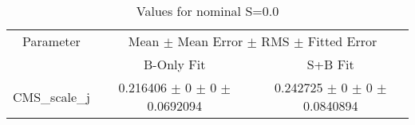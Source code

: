 \begin{table}
\centering
\caption{Values for nominal S=0.0}
\begin{tabular}{ccc}
\toprule
Parameter & \multicolumn{2}{c}{Mean $\pm$ Mean Error $\pm$ RMS $\pm$ Fitted Error}\\
 & B-Only Fit & S+B Fit\\
\midrule
CMS\_scale\_j & \num{0.216406} $\pm$ \num{0} $\pm$ \num{0} $\pm$ \num{0.0692094} & \num{0.242725} $\pm$ \num{0} $\pm$ \num{0} $\pm$ \num{0.0840894}\\
\bottomrule
\end{tabular}
\end{table}